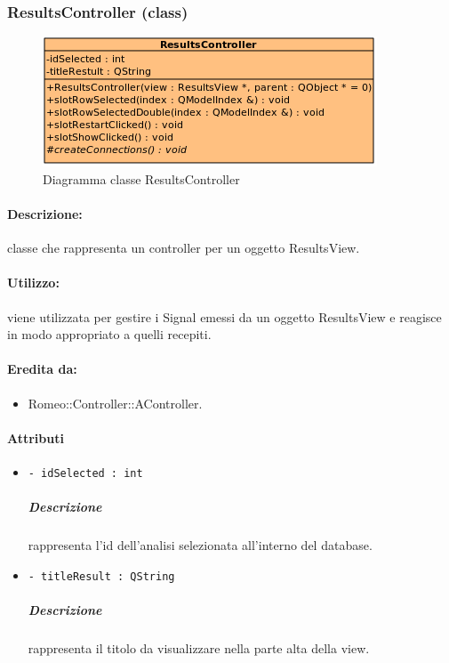 	\subsubsection{ResultsController (class)}
	\begin{figure}[!h]
		\centering
		\includegraphics[scale=2.75]{./Content/Immagini/controller/ResultsController.png}
		\caption{Diagramma classe ResultsController}
	\end{figure}
	\paragraph{Descrizione:} classe che rappresenta un controller per un oggetto ResultsView.
	\paragraph{Utilizzo:} viene utilizzata per gestire i Signal\g{} emessi da un oggetto ResultsView e reagisce in modo appropriato a quelli recepiti.
	\paragraph{Eredita da:}
		\begin{itemize}
			\item Romeo::Controller::AController.
		\end{itemize}
	\paragraph{Attributi}
		\begin{itemize}
			\item \color{teal} \verb!- idSelected : int!
			\color{black}
			\subparagraph{Descrizione} rappresenta l'id dell'analisi selezionata all'interno del database.
			\item \color{teal} \verb!- titleResult : QString!
			\color{black}
			\subparagraph{Descrizione} rappresenta il titolo da visualizzare nella parte alta della view.
		\end{itemize}
